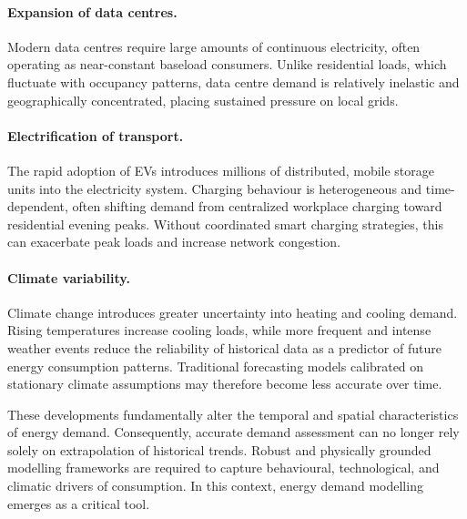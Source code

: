 \paragraph{Expansion of data centres.} 
Modern data centres require large amounts of continuous electricity, often operating as near-constant baseload consumers. Unlike residential loads, which fluctuate with occupancy patterns, data centre demand is relatively inelastic and geographically concentrated, placing sustained pressure on local grids.

\paragraph{Electrification of transport.} 
The rapid adoption of EVs introduces millions of distributed, mobile storage units into the electricity system. Charging behaviour is heterogeneous and time-dependent, often shifting demand from centralized workplace charging toward residential evening peaks. Without coordinated smart charging strategies, this can exacerbate peak loads and increase network congestion.

\paragraph{Climate variability.} 
Climate change introduces greater uncertainty into heating and cooling demand. Rising temperatures increase cooling loads, while more frequent and intense weather events reduce the reliability of historical data as a predictor of future energy consumption patterns. Traditional forecasting models calibrated on stationary climate assumptions may therefore become less accurate over time.

These developments fundamentally alter the temporal and spatial characteristics of energy demand. Consequently, accurate demand assessment can no longer rely solely on extrapolation of historical trends. Robust and physically grounded modelling frameworks are required to capture behavioural, technological, and climatic drivers of consumption. In this context, energy demand modelling emerges as a critical tool.



